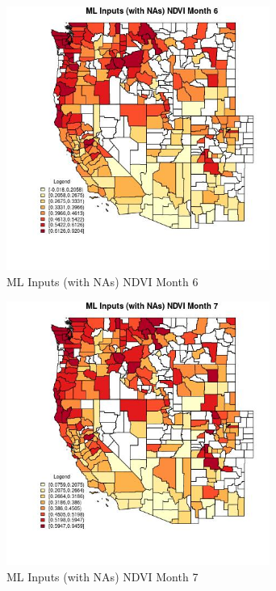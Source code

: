 \begin{figure} 
\centering  
\includegraphics[width=0.77\textwidth]{Code_Outputs/Report_ML_input_PM25_Step4_part_f_de_duplicated_aves_prioritize_24hr_obswNAs_CountyNDVImedianMonth6.jpg} 
\caption{\label{fig:Report_ML_input_PM25_Step4_part_f_de_duplicated_aves_prioritize_24hr_obswNAsCountyNDVImedianMonth6}ML Inputs (with NAs) NDVI Month 6} 
\end{figure} 
 

\begin{figure} 
\centering  
\includegraphics[width=0.77\textwidth]{Code_Outputs/Report_ML_input_PM25_Step4_part_f_de_duplicated_aves_prioritize_24hr_obswNAs_CountyNDVImedianMonth7.jpg} 
\caption{\label{fig:Report_ML_input_PM25_Step4_part_f_de_duplicated_aves_prioritize_24hr_obswNAsCountyNDVImedianMonth7}ML Inputs (with NAs) NDVI Month 7} 
\end{figure} 
 

